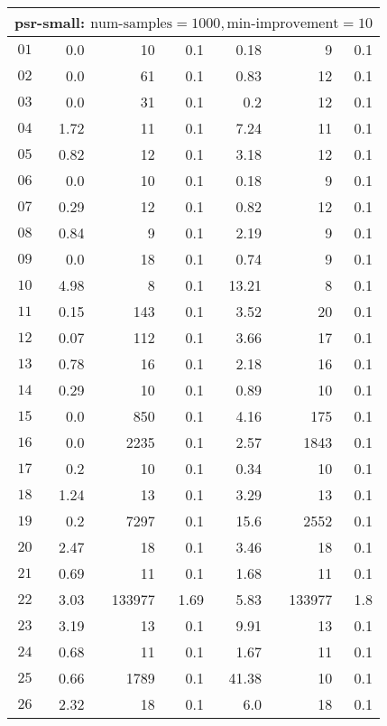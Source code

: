 \begin{longtable}{|c||r|r|r||r|r|r|}
\multicolumn{7}{|l|}{psr-small: $\text{num-samples}=1000,\text{min-improvement}=10$}\\\hline
$01$ & 0.0 & 10 & 0.1 &0.18 & 9 & 0.1 \\\hline
$02$ & 0.0 & 61 & 0.1 &0.83 & 12 & 0.1 \\\hline
$03$ & 0.0 & 31 & 0.1 &0.2 & 12 & 0.1 \\\hline
$04$ & 1.72 & 11 & 0.1 &7.24 & 11 & 0.1 \\\hline
$05$ & 0.82 & 12 & 0.1 &3.18 & 12 & 0.1 \\\hline
$06$ & 0.0 & 10 & 0.1 &0.18 & 9 & 0.1 \\\hline
$07$ & 0.29 & 12 & 0.1 &0.82 & 12 & 0.1 \\\hline
$08$ & 0.84 & 9 & 0.1 &2.19 & 9 & 0.1 \\\hline
$09$ & 0.0 & 18 & 0.1 &0.74 & 9 & 0.1 \\\hline
$10$ & 4.98 & 8 & 0.1 &13.21 & 8 & 0.1 \\\hline
$11$ & 0.15 & 143 & 0.1 &3.52 & 20 & 0.1 \\\hline
$12$ & 0.07 & 112 & 0.1 &3.66 & 17 & 0.1 \\\hline
$13$ & 0.78 & 16 & 0.1 &2.18 & 16 & 0.1 \\\hline
$14$ & 0.29 & 10 & 0.1 &0.89 & 10 & 0.1 \\\hline
$15$ & 0.0 & 850 & 0.1 &4.16 & 175 & 0.1 \\\hline
$16$ & 0.0 & 2235 & 0.1 &2.57 & 1843 & 0.1 \\\hline
$17$ & 0.2 & 10 & 0.1 &0.34 & 10 & 0.1 \\\hline
$18$ & 1.24 & 13 & 0.1 &3.29 & 13 & 0.1 \\\hline
$19$ & 0.2 & 7297 & 0.1 &15.6 & 2552 & 0.1 \\\hline
$20$ & 2.47 & 18 & 0.1 &3.46 & 18 & 0.1 \\\hline
$21$ & 0.69 & 11 & 0.1 &1.68 & 11 & 0.1 \\\hline
$22$ & 3.03 & 133977 & 1.69 &5.83 & 133977 & 1.8 \\\hline
$23$ & 3.19 & 13 & 0.1 &9.91 & 13 & 0.1 \\\hline
$24$ & 0.68 & 11 & 0.1 &1.67 & 11 & 0.1 \\\hline
$25$ & 0.66 & 1789 & 0.1 &41.38 & 10 & 0.1 \\\hline
$26$ & 2.32 & 18 & 0.1 &6.0 & 18 & 0.1 \\\hline

\end{longtable}
